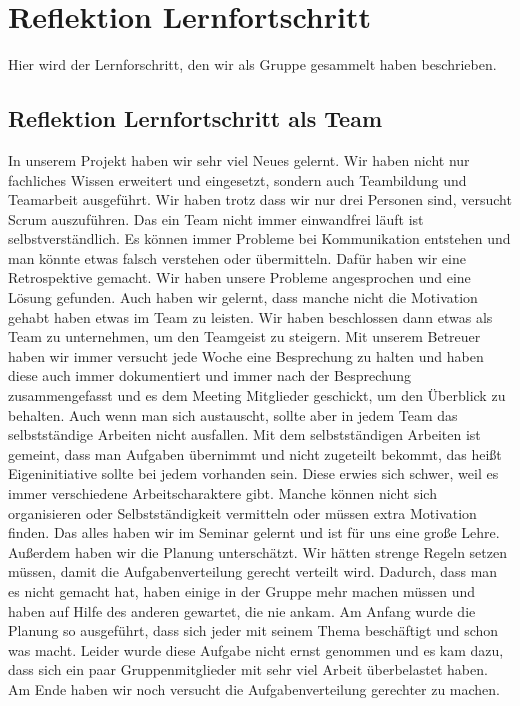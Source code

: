 \section{Reflektion Lernfortschritt}
Hier wird der Lernforschritt, den wir als Gruppe gesammelt haben beschrieben.

\subsection{Reflektion Lernfortschritt als Team}
In unserem Projekt haben wir sehr viel Neues gelernt. Wir haben nicht nur fachliches Wissen erweitert und eingesetzt, sondern auch Teambildung und Teamarbeit ausgeführt. Wir haben trotz dass wir nur drei Personen sind, versucht Scrum auszuführen.\newline
Das ein Team nicht immer einwandfrei läuft ist selbstverständlich. 
Es können immer Probleme bei Kommunikation entstehen und man könnte etwas falsch verstehen oder übermitteln. 
Dafür haben wir eine Retrospektive gemacht. Wir haben unsere Probleme angesprochen und eine Lösung gefunden. 
Auch haben wir gelernt, dass manche nicht die Motivation gehabt haben etwas im Team zu leisten. Wir haben beschlossen dann etwas als Team zu unternehmen, um den Teamgeist zu steigern. 
Mit unserem Betreuer haben wir immer versucht jede Woche eine Besprechung zu halten und haben diese auch immer dokumentiert und immer nach der Besprechung zusammengefasst und es dem Meeting Mitglieder geschickt, um den Überblick zu behalten. 
Auch wenn man sich austauscht, sollte aber in jedem Team das selbstständige Arbeiten nicht ausfallen. Mit dem selbstständigen Arbeiten ist gemeint, 
dass man Aufgaben übernimmt und nicht zugeteilt bekommt, das heißt Eigeninitiative sollte bei jedem vorhanden sein. Diese erwies sich schwer, weil es immer verschiedene Arbeitscharaktere gibt. 
Manche können nicht sich organisieren oder Selbstständigkeit vermitteln oder müssen extra Motivation finden. Das alles haben wir im Seminar gelernt und ist für uns eine große Lehre.\newline
Außerdem haben wir die Planung unterschätzt. Wir hätten strenge Regeln setzen müssen, damit die Aufgabenverteilung gerecht verteilt wird. 
Dadurch, dass man es nicht gemacht hat, haben einige in der Gruppe mehr machen müssen und haben auf Hilfe des anderen gewartet, die nie ankam. Am Anfang wurde die Planung so ausgeführt, dass sich jeder mit seinem Thema beschäftigt und schon was macht. 
Leider wurde diese Aufgabe nicht ernst genommen und es kam dazu, dass sich ein paar Gruppenmitglieder mit sehr viel Arbeit überbelastet haben. Am Ende haben wir noch versucht die Aufgabenverteilung gerechter zu machen. 
